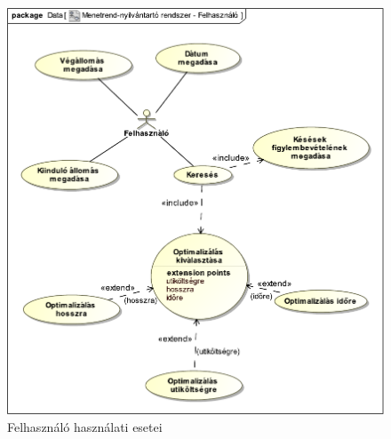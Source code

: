 \begin{figure}[!ht]
\centering
\includegraphics[width=150mm, keepaspectratio]{img/use-case-user}
\caption{Felhasználó használati esetei}
\label{fig:use-case-user}
\end{figure}

\clearpage\setcounter{page}{1}